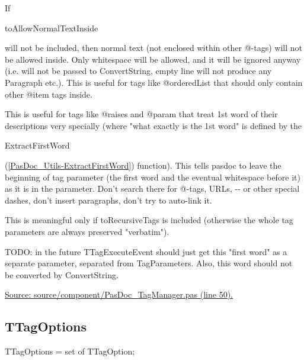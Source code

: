 \documentclass{report}
\newif\ifpdf
\begin{document}
\begin{list}{}
\begin{description}
If \begin{ttfamily}toAllowNormalTextInside\end{ttfamily} will not be included, then normal text (not enclosed within other @{-}tags) will not be allowed inside. Only whitespace will be allowed, and it will be ignored anyway (i.e. will not be passed to ConvertString, empty line will not produce any Paragraph etc.). This is useful for tags like @orderedList that should only contain other @item tags inside.
\item[\texttt{toFirstWordVerbatim}] \label{PasDoc_TagManager-toFirstWordVerbatim}
\index{}
This is useful for tags like @raises and @param that treat 1st word of their descriptions very specially (where "what exactly is the 1st word" is defined by the \begin{ttfamily}ExtractFirstWord\end{ttfamily}(\ref{PasDoc_Utils-ExtractFirstWord}) function). This tells pasdoc to leave the beginning of tag parameter (the first word and the eventual whitespace before it) as it is in the parameter. Don't search there for @{-}tags, URLs, {-}{-} or other special dashes, don't insert paragraphs, don't try to auto{-}link it.

This is meaningful only if toRecursiveTags is included (otherwise the whole tag parameters are always preserved "verbatim").

TODO: in the future TTagExecuteEvent should just get this "first word" as a separate parameter, separated from TagParameters. Also, this word should not be converted by ConvertString.
\end{description}
\par
\href{https://github.com/pasdoc/pasdoc/blob/master/source/component/PasDoc_TagManager.pas#L50}{Source: source/component/PasDoc{\_}TagManager.pas (line 50).}

\end{list}
\ifpdf
\subsection*{\large{\textbf{TTagOptions}}\normalsize\hspace{1ex}\hrulefill}
\else
\subsection*{TTagOptions}
\fi
\label{PasDoc_TagManager-TTagOptions}
\begin{list}{}{
\setlength{\itemindent}{0cm}
\setlength{\listparindent}{0cm}
\setlength{\leftmargin}{\evensidemargin}
\addtolength{\leftmargin}{\tmplength}
\settowidth{\labelsep}{X}
\addtolength{\leftmargin}{\labelsep}
\setlength{\labelwidth}{\tmplength}
}
\item[\textbf{Declaration}\hfill]
\ifpdf
\begin{flushleft}
\fi
\begin{ttfamily}
TTagOptions = set of TTagOption;\end{ttfamily}

\ifpdf
\end{flushleft}
\fi

\end{list}
\ifpdf
\end{document}
